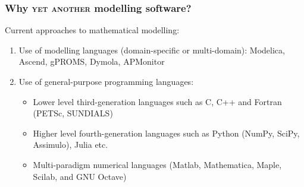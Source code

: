 \documentclass[compress,newPxFont,sthlmFooter]{beamer}
\newcommand{\skipcite}[1]{}
\begin{document}
\begin{frame}
\frametitle{Why \textsc{yet another} modelling software?}
Current approaches to mathematical modelling:
\begin{enumerate}
   \item Use of \alert{modelling languages} (domain-specific or multi-domain):
         \alert{Modelica}\skipcite{Fritzson-and-Engelson-1998}, 
         \alert{Ascend}\skipcite{Piela-etal-1991}, 
         \alert{gPROMS}\skipcite{Barton-and-Pantelides-1994}, 
         \alert{Dymola}\skipcite{Elmqvist-1978}, 
         \alert{APMonitor}\skipcite{APMonitor-2014}
   \item Use of \alert{general-purpose programming languages}:
      \begin{itemize}
          \item Lower level third-generation languages such as C, C++ and Fortran
                (\alert{PETSc}\skipcite{petsc}, 
                 \alert{SUNDIALS}\skipcite{Hindmarsh-etal-2005})
          \item Higher level fourth-generation languages such as \alert{Python} (NumPy, SciPy, Assimulo\skipcite{Assimulo-2015}), 
                                                                 \alert{Julia} etc.
          \item Multi-paradigm numerical languages 
                (\alert{Matlab}\skipcite{matlab}, 
                 \alert{Mathematica}\skipcite{mathematica}, 
                 \alert{Maple}\skipcite{maple}, 
                 \alert{Scilab}\skipcite{scilab}, and 
                 \alert{GNU Octave}\skipcite{octave})
      \end{itemize}
 \end{enumerate}
\end{frame}
\end{document}
